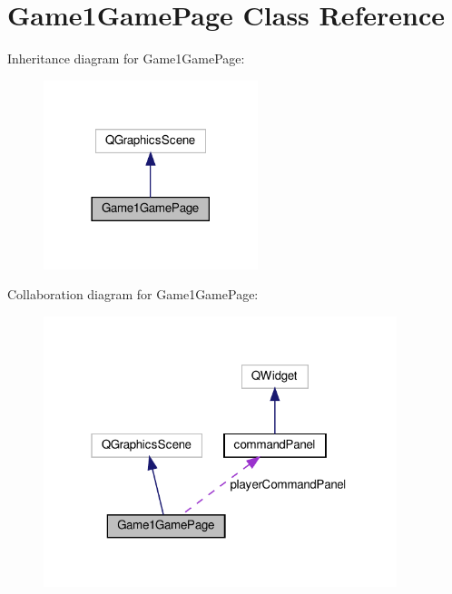 \hypertarget{classGame1GamePage}{}\section{Game1\+Game\+Page Class Reference}
\label{classGame1GamePage}


Inheritance diagram for Game1\+Game\+Page\+:
\nopagebreak
\begin{figure}[H]
\begin{center}
\leavevmode
\includegraphics[width=177pt]{classGame1GamePage__inherit__graph}
\end{center}
\end{figure}


Collaboration diagram for Game1\+Game\+Page\+:
\nopagebreak
\begin{figure}[H]
\begin{center}
\leavevmode
\includegraphics[width=292pt]{classGame1GamePage__coll__graph}
\end{center}
\end{figure}
